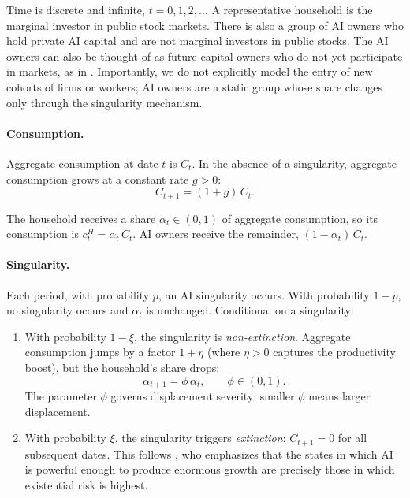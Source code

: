 \documentclass[12pt]{article}
\begin{document}
Time is discrete and infinite, $t = 0, 1, 2, \ldots$ A representative household is the marginal investor in public stock markets. There is also a group of AI owners who hold private AI capital and are not marginal investors in public stocks. The AI owners can also be thought of as future capital owners who do not yet participate in markets, as in \citet{GKP2012}. Importantly, we do not explicitly model the entry of new cohorts of firms or workers; AI owners are a static group whose share changes only through the singularity mechanism.

\paragraph{Consumption.}
Aggregate consumption at date $t$ is $C_t$. In the absence of a singularity, aggregate consumption grows at a constant rate $g > 0$:
%
\begin{equation}
C_{t+1} = (1 + g) \, C_t. \label{eq:agg-consumption-growth}
\end{equation}

The household receives a share $\alpha_t \in (0, 1)$ of aggregate consumption, so its consumption is $c_t^H = \alpha_t \, C_t$. AI owners receive the remainder, $(1 - \alpha_t) \, C_t$.

\paragraph{Singularity.}
Each period, with probability $p$, an AI singularity occurs. With probability $1 - p$, no singularity occurs and $\alpha_t$ is unchanged. Conditional on a singularity:
%
\begin{enumerate}
\item With probability $1 - \xi$, the singularity is \emph{non-extinction}. Aggregate consumption jumps by a factor $1 + \eta$ (where $\eta > 0$ captures the productivity boost), but the household's share drops:
\begin{equation}
\alpha_{t+1} = \phi \, \alpha_t, \qquad \phi \in (0,1). \label{eq:displacement}
\end{equation}
The parameter $\phi$ governs displacement severity: smaller $\phi$ means larger displacement.
\item With probability $\xi$, the singularity triggers \emph{extinction}: $C_{t+1} = 0$ for all subsequent dates. This follows \citet{Jones2024}, who emphasizes that the states in which AI is powerful enough to produce enormous growth are precisely those in which existential risk is highest.
\end{enumerate}
\end{document}
